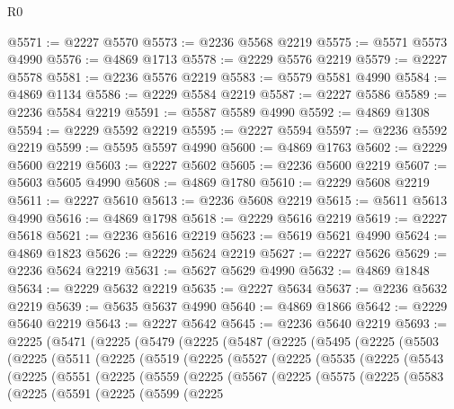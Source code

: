 \begin{lexlean}{R0}
\begin{coremodule}
@5571 := @2227 @5570
@5573 := @2236 @5568 @2219
@5575 := @5571 @5573 @4990
@5576 := @4869 @1713
@5578 := @2229 @5576 @2219
@5579 := @2227 @5578
@5581 := @2236 @5576 @2219
@5583 := @5579 @5581 @4990
@5584 := @4869 @1134
@5586 := @2229 @5584 @2219
@5587 := @2227 @5586
@5589 := @2236 @5584 @2219
@5591 := @5587 @5589 @4990
@5592 := @4869 @1308
@5594 := @2229 @5592 @2219
@5595 := @2227 @5594
@5597 := @2236 @5592 @2219
@5599 := @5595 @5597 @4990
@5600 := @4869 @1763
@5602 := @2229 @5600 @2219
@5603 := @2227 @5602
@5605 := @2236 @5600 @2219
@5607 := @5603 @5605 @4990
@5608 := @4869 @1780
@5610 := @2229 @5608 @2219
@5611 := @2227 @5610
@5613 := @2236 @5608 @2219
@5615 := @5611 @5613 @4990
@5616 := @4869 @1798
@5618 := @2229 @5616 @2219
@5619 := @2227 @5618
@5621 := @2236 @5616 @2219
@5623 := @5619 @5621 @4990
@5624 := @4869 @1823
@5626 := @2229 @5624 @2219
@5627 := @2227 @5626
@5629 := @2236 @5624 @2219
@5631 := @5627 @5629 @4990
@5632 := @4869 @1848
@5634 := @2229 @5632 @2219
@5635 := @2227 @5634
@5637 := @2236 @5632 @2219
@5639 := @5635 @5637 @4990
@5640 := @4869 @1866
@5642 := @2229 @5640 @2219
@5643 := @2227 @5642
@5645 := @2236 @5640 @2219
@5693 := @2225
    (@5471
      (@2225
        (@5479
          (@2225
            (@5487
              (@2225
                (@5495
                  (@2225
                    (@5503
                      (@2225
                        (@5511
                          (@2225
                            (@5519
                              (@2225
                                (@5527
                                  (@2225
                                    (@5535
                                      (@2225
                                        (@5543
                                          (@2225
                                            (@5551
                                              (@2225
                                                (@5559
                                                  (@2225
                                                    (@5567
                                                      (@2225
                                                        (@5575
                                                          (@2225
                                                            (@5583
                                                              (@2225
                                                                (@5591
                                                                  (@2225
                                                                    (@5599
                                                                      (@2225

\end{coremodule}
\end{lexlean}
